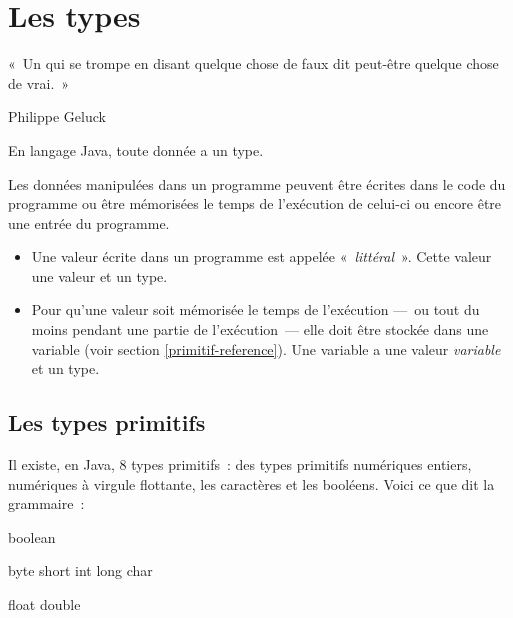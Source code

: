\chapter{Les types}
\label{chap:types}

\begin{Exergue}

	«~Un  qui se trompe en disant quelque chose de faux dit peut-être
	quelque chose de vrai.~»

	\begin{flushright}

		Philippe Geluck
		
	\end{flushright}

\end{Exergue}

En langage Java, toute donnée a un type. 

Les données manipulées dans un programme peuvent être écrites dans le code du
programme ou être mémorisées le temps de l'exécution de celui-ci ou encore être
une entrée du programme. 


\begin{itemize}
	\item Une valeur écrite dans un programme est appelée
		«~\textit{littéral}~». Cette valeur une valeur et un type. 

	\item Pour qu'une valeur soit mémorisée le temps de l'exécution —~ou tout
		du moins pendant une partie de l'exécution~— elle doit être stockée
		dans une variable (voir section \vref{primitif-reference}). Une
		variable a une valeur \textit{variable} et un type. 

\end{itemize}

\minitoc

\section{Les types primitifs}

Il existe, en Java, 8 types primitifs~: des types primitifs numériques
entiers, numériques à virgule flottante, les  caractères et les booléens.
Voici ce que dit la grammaire~: 

\begin{grammaire}
		boolean


		byte short int long char

		float double
\end{grammaire}

